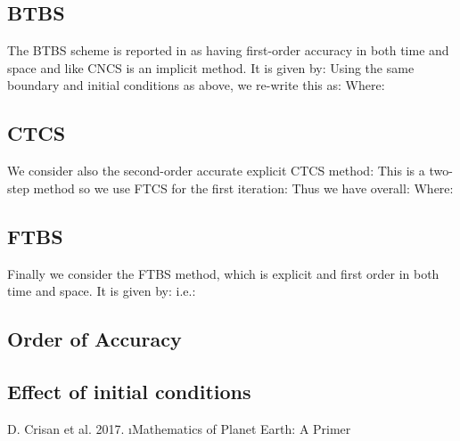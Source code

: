 \documentclass[10pt]{article}
\begin{document}
\subsection{BTBS}

The BTBS scheme is reported in \cite{MPE} as having first-order accuracy in both time and space and like CNCS is an implicit method. It is given by:
Using the same boundary and initial conditions as above, we re-write this as:
Where:

\subsection{CTCS}

We consider also the second-order accurate explicit CTCS method:
This is a two-step method so we use FTCS for the first iteration:
Thus we have overall:
Where:

\subsection{FTBS}

Finally we consider the FTBS method, which is explicit and first order in both time and space. It is given by:
i.e.:

\subsection{Order of Accuracy}



\subsection{Effect of initial conditions}


\begin{thebibliography}{9}
	 D. Crisan et al. 2017. \i{Mathematics of Planet Earth: A Primer}
\end{thebibliography}
\end{document}
